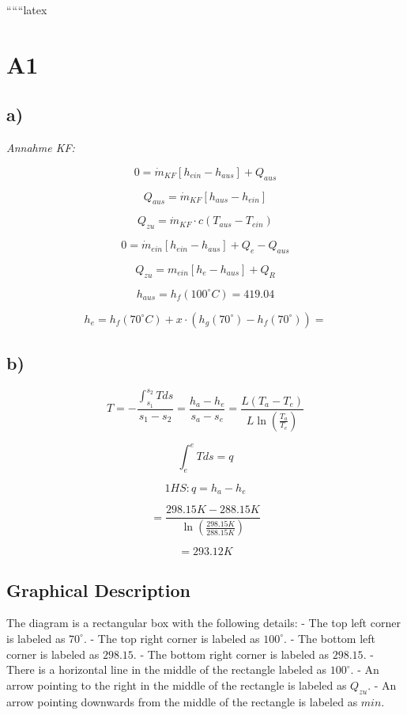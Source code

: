 
``````latex


\section*{A1}

\subsection*{a)}

\textit{Annahme KF:}

\[
0 = \dot{m}_{KF} \left[ h_{ein} - h_{aus} \right] + Q_{aus}
\]

\[
Q_{aus} = \dot{m}_{KF} \left[ h_{aus} - h_{ein} \right]
\]

\[
Q_{zu} = \dot{m}_{KF} \cdot c \left( T_{aus} - T_{ein} \right)
\]

\[
0 = \dot{m}_{ein} \left[ h_{ein} - h_{aus} \right] + Q_{e} - Q_{aus}
\]

\[
Q_{zu} = m_{ein} \left[ h_{e} - h_{aus} \right] + Q_{R}
\]

\[
h_{aus} = h_{f} \left( 100^\circ C \right) = 419.04
\]

\[
h_{e} = h_{f} \left( 70^\circ C \right) + x \cdot \left( h_{g} \left( 70^\circ \right) - h_{f} \left( 70^\circ \right) \right) =
\]

\subsection*{b)}

\[
T = - \frac{\int_{s_1}^{s_2} T ds}{s_1 - s_2} = \frac{h_a - h_e}{s_a - s_e} = \frac{L \left( T_a - T_e \right)}{L \ln \left( \frac{T_a}{T_e} \right)}
\]

\[
\int_{e}^{e} T ds = q
\]

\[
1HS: q = h_{a} - h_{e}
\]

\[
= \frac{298.15 K - 288.15 K}{\ln \left( \frac{298.15 K}{288.15 K} \right)}
\]

\[
= 293.12 K
\]

\subsection*{Graphical Description}

The diagram is a rectangular box with the following details:
- The top left corner is labeled as $70^\circ$.
- The top right corner is labeled as $100^\circ$.
- The bottom left corner is labeled as $298.15$.
- The bottom right corner is labeled as $298.15$.
- There is a horizontal line in the middle of the rectangle labeled as $100^\circ$.
- An arrow pointing to the right in the middle of the rectangle is labeled as $Q_{zu}$.
- An arrow pointing downwards from the middle of the rectangle is labeled as $min$.


